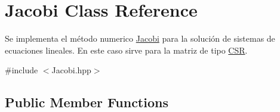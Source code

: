 \hypertarget{class_jacobi}{}\section{Jacobi Class Reference}
\label{class_jacobi}


Se implementa el método numerico \hyperlink{class_jacobi}{Jacobi} para la solución de sistemas de ecuaciones lineales. En este caso sirve para la matriz de tipo \hyperlink{class_c_s_r}{C\+SR}.  




{\ttfamily \#include $<$Jacobi.\+hpp$>$}

\subsection*{Public Member Functions}

